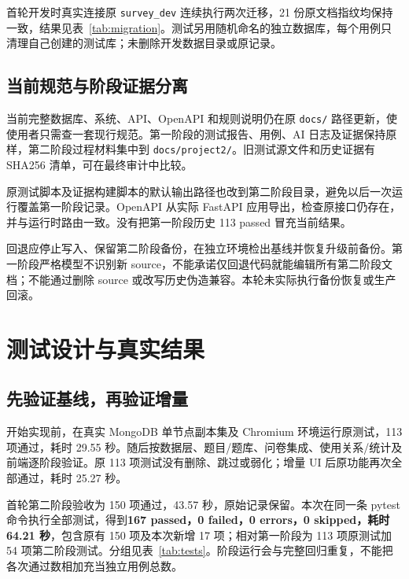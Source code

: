 \documentclass[UTF8,10pt,a4paper,twocolumn,fontset=none]{ctexart}
\newcommand{\term}[1]{\textbf{#1}}
\begin{document}
首轮开发时真实连接原 \texttt{survey\_dev} 连续执行两次迁移，21 份原文档指纹均保持一致，结果见表~\ref{tab:migration}。测试另用随机命名的独立数据库，每个用例只清理自己创建的测试库；未删除开发数据目录或原记录。

\subsection{当前规范与阶段证据分离}
当前完整数据库、系统、API、OpenAPI 和规则说明仍在原 \texttt{docs/} 路径更新，使使用者只需查一套现行规范。第一阶段的测试报告、用例、AI 日志及证据保持原样，第二阶段过程材料集中到 \texttt{docs/project2/}。旧测试源文件和历史证据有 SHA256 清单，可在最终审计中比较。

原测试脚本及证据构建脚本的默认输出路径也改到第二阶段目录，避免以后一次运行覆盖第一阶段记录。OpenAPI 从实际 FastAPI 应用导出，检查原接口仍存在，并与运行时路由一致。没有把第一阶段历史 113 passed 冒充当前结果。

回退应停止写入、保留第二阶段备份，在独立环境检出基线并恢复升级前备份。第一阶段严格模型不识别新 source，不能承诺仅回退代码就能编辑所有第二阶段文档；不能通过删除 source 或改写历史伪造兼容。本轮未实际执行备份恢复或生产回滚。

\section{测试设计与真实结果}
\subsection{先验证基线，再验证增量}
开始实现前，在真实 MongoDB 单节点副本集及 Chromium 环境运行原测试，113 项通过，耗时 29.55 秒。随后按数据层、题目/题库、问卷集成、使用关系/统计及前端逐阶段验证。原 113 项测试没有删除、跳过或弱化；增量 UI 后原功能再次全部通过，耗时 25.27 秒。

首轮第二阶段验收为 150 项通过，43.57 秒，原始记录保留。本次在同一条 pytest 命令执行全部测试，得到\term{167 passed，0 failed，0 errors，0 skipped，耗时 64.21 秒}，包含原有 150 项及本次新增 17 项；相对第一阶段为 113 项原测试加 54 项第二阶段测试。分组见表~\ref{tab:tests}。阶段运行会与完整回归重复，不能把各次通过数相加充当独立用例总数。
\end{document}
